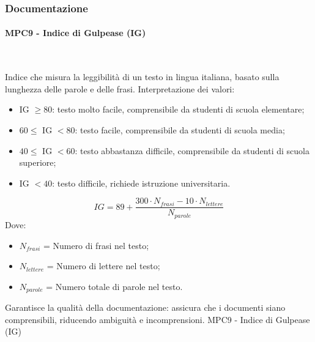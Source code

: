 \documentclass[10pt, letterpaper]{article}
\newcommand{\trisubsection}[1]{\paragraph{#1}\mbox{}\\}
\begin{document}
\subsubsection{Documentazione}
\trisubsection{MPC9 - Indice di Gulpease (IG)}
{Indice che misura la leggibilità di un testo in lingua italiana, basato sulla
    lunghezza delle parole e delle frasi.
    Interpretazione dei valori:
    \begin{itemize}
        \item IG $\geq 80$: testo molto facile, comprensibile da studenti di scuola elementare;
        \item $60 \leq$ IG $< 80$: testo facile, comprensibile da studenti di scuola media;
        \item $40 \leq$ IG $< 60$: testo abbastanza difficile, comprensibile da studenti di scuola superiore;
        \item IG $< 40$: testo difficile, richiede istruzione universitaria.
    \end{itemize}}
{\[ IG = 89 + \frac{300 \cdot N_{frasi} - 10 \cdot N_{lettere}}{N_{parole}} \]
    Dove:
    \begin{itemize}
        \item $N_{frasi}$ = Numero di frasi nel testo;
        \item $N_{lettere}$ = Numero di lettere nel testo;
        \item $N_{parole}$ = Numero totale di parole nel testo.
    \end{itemize}
}
{Garantisce la qualità della documentazione: assicura che i documenti siano comprensibili,
    riducendo ambiguità e incomprensioni.}
{MPC9 - Indice di Gulpease (IG)}

\end{document}
